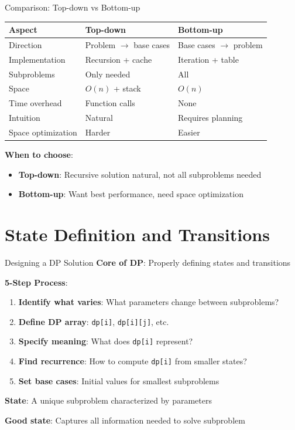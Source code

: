 \documentclass[aspectratio=169]{beamer}
\begin{document}
\begin{frame}{Comparison: Top-down vs Bottom-up}
  \begin{center}
  \small
  \begin{tabular}{|l|l|l|}
    \hline
    \textbf{Aspect} & \textbf{Top-down} & \textbf{Bottom-up} \\
    \hline
    Direction & Problem $\to$ base cases & Base cases $\to$ problem \\
    Implementation & Recursion + cache & Iteration + table \\
    Subproblems & Only needed & All \\
    Space & $O(n)$ + stack & $O(n)$ \\
    Time overhead & Function calls & None \\
    Intuition & Natural & Requires planning \\
    Space optimization & Harder & Easier \\
    \hline
  \end{tabular}
  \end{center}

  \vspace{0.5cm}

  \textbf{When to choose}:
  \begin{itemize}
    \item \textbf{Top-down}: Recursive solution natural, not all subproblems needed
    \item \textbf{Bottom-up}: Want best performance, need space optimization
  \end{itemize}
\end{frame}

\section{State Definition and Transitions}

\begin{frame}{Designing a DP Solution}
  \textbf{Core of DP}: Properly defining states and transitions

  \vspace{0.5cm}

  \textbf{5-Step Process}:
  \begin{enumerate}
    \item \textbf{Identify what varies}: What parameters change between subproblems?
    \item \textbf{Define DP array}: \texttt{dp[i]}, \texttt{dp[i][j]}, etc.
    \item \textbf{Specify meaning}: What does \texttt{dp[i]} represent?
    \item \textbf{Find recurrence}: How to compute \texttt{dp[i]} from smaller states?
    \item \textbf{Set base cases}: Initial values for smallest subproblems
  \end{enumerate}

  \vspace{0.5cm}

  \textbf{State}: A unique subproblem characterized by parameters

  \textbf{Good state}: Captures all information needed to solve subproblem
\end{frame}
\end{document}

